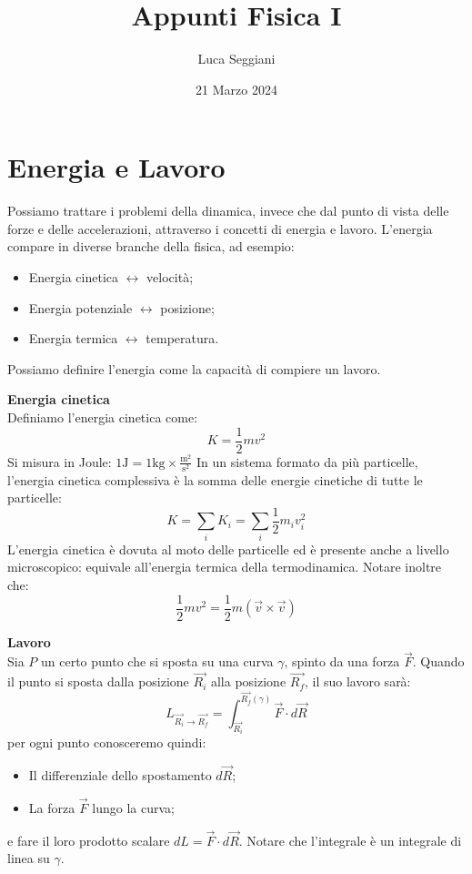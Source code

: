 \documentclass[a4paper,12pt]{article}
\title{Appunti Fisica I}
\author{Luca Seggiani}
\date{21 Marzo 2024}
\begin{document}
\maketitle
\section{Energia e Lavoro}
Possiamo trattare i problemi della dinamica, invece che dal punto di vista delle forze e delle accelerazioni,
attraverso i concetti di energia e lavoro. L'energia compare in diverse branche della fisica, ad esempio:
\begin{itemize}
  \item Energia cinetica $\leftrightarrow$ velocità;
  \item Energia potenziale $\leftrightarrow$ posizione;
  \item Energia termica $\leftrightarrow$ temperatura.
\end{itemize}
Possiamo definire l'energia come la capacità di compiere un lavoro.
\par\smallskip
\textbf{Energia cinetica} \\
Definiamo l'energia cinetica come:
$$ K = \frac{1}{2}mv^2$$
Si misura in Joule: $1\mathrm{J} = 1\mathrm{kg}\times\frac{\mathrm{m}^2}{\mathrm{s}^2}$
In un sistema formato da più particelle, l'energia cinetica complessiva è la somma delle energie cinetiche di
tutte le particelle:
$$ K = \sum_i{K_i} = \sum_i \frac{1}{2}m_iv_i^2 $$
L'energia cinetica è dovuta al moto delle particelle ed è presente anche a livello microscopico: equivale
all'energia termica della termodinamica. Notare inoltre che:
$$ \frac{1}{2}mv^2 = \frac{1}{2}m(\vec{v} \times \vec{v}) $$
\par\smallskip
\textbf{Lavoro} \\
Sia $P$ un certo punto che si sposta su una curva $\gamma$, spinto da una forza $\vec{F}$. Quando il punto
si sposta dalla posizione $\vec{R_i}$ alla posizione $\vec{R_f}$, il suo lavoro sarà:
$$ L_{\vec{R_i} \rightarrow \vec{R_f}} = \int_{\vec{R_i}}^{\vec{R_f} (\gamma)}  \vec{F} \cdot d\vec{R} $$
per ogni punto conosceremo quindi:
\begin{itemize}
  \item Il differenziale dello spostamento $d\vec{R}$;
  \item La forza $\vec{F}$ lungo la curva;
\end{itemize}
e fare il loro prodotto scalare $dL = \vec{F} \cdot d\vec{R}$. Notare che l'integrale è un integrale
di linea su $\gamma$.
\par\smallskip
\end{document}

